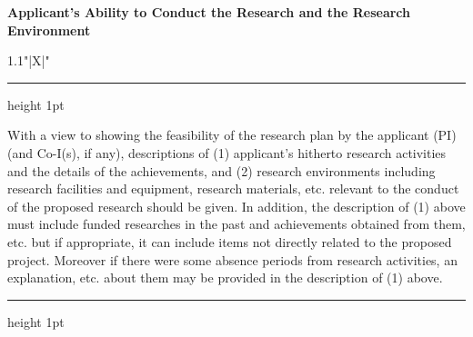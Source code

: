 \documentclass[8pt]{extarticle}
\makeatletter
\newcommand{\thickhline}{%
	\noalign {\ifnum 0=`}\fi \hrule height 1pt
	\futurelet \reserved@a \@xhline
}
\makeatother
\begin{document}
	
\noindent\textbf{\fontsize{12}{12}\selectfont Applicant's Ability to Conduct the Research and the Research Environment}\\
\begin{tabularx}{1.1\linewidth}{"|X|"}
	\thickhline
	With a view to showing the feasibility of the research plan by the applicant (PI) (and Co-I(s), if any), descriptions of (1) applicant's hitherto research activities and the details of the achievements, and (2) research environments including research facilities and equipment, research materials, etc. relevant to the conduct of the proposed research should be given. In addition, the description of (1) above must include funded researches in the past and achievements obtained from them, etc. but if appropriate, it can include items not directly related to the proposed project. Moreover if there were some absence periods from research activities, an explanation, etc. about them may be provided in the description of (1) above.
	\\
	\thickhline
\end{tabularx}
\end{document}
